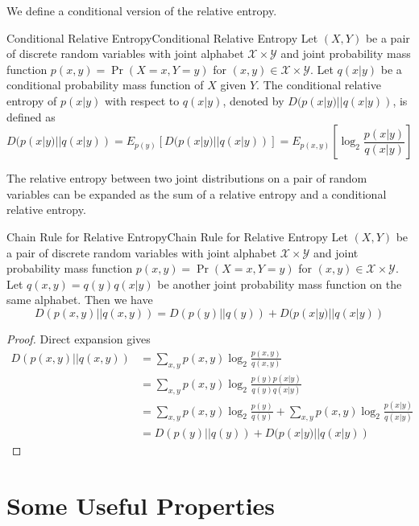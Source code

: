 \documentclass[../main.tex]{subfiles}
\begin{document}
We define a conditional version of the relative entropy.
\begin{definition}{Conditional Relative Entropy}{Conditional Relative Entropy}
  Let $(X,Y)$ be a pair of discrete random variables with joint alphabet $\mathcal{X} \times \mathcal{Y}$ and joint probability mass function $p(x,y) = \Pr(X=x,Y=y)$ for $(x,y) \in \mathcal{X} \times \mathcal{Y}$. Let $q(x|y)$ be a conditional probability mass function of $X$ given $Y$. The conditional relative entropy of $p(x|y)$ with respect to $q(x|y)$, denoted by $D(p(x|y)||q(x|y))$, is defined as
  \begin{equation}
    D(p(x|y)||q(x|y)) = E_{p(y)}[D(p(x|y)||q(x|y))] = E_{p(x,y)}\left[\log_2 \frac{p(x|y)}{q(x|y)}\right]
  \end{equation}
\end{definition}

The relative entropy between two joint distributions on a pair of random variables can be expanded as the sum of a relative entropy and a conditional relative entropy.

\begin{theorem}{Chain Rule for Relative Entropy}{Chain Rule for Relative Entropy}
  Let $(X,Y)$ be a pair of discrete random variables with joint alphabet $\mathcal{X} \times \mathcal{Y}$ and joint probability mass function $p(x,y) = \Pr(X=x,Y=y)$ for $(x,y) \in \mathcal{X} \times \mathcal{Y}$. Let $q(x,y) = q(y)q(x|y)$ be another joint probability mass function on the same alphabet. Then we have
  \begin{equation}
    D(p(x,y)||q(x,y)) = D(p(y)||q(y)) + D(p(x|y)||q(x|y))
  \end{equation}
\end{theorem}
\begin{proof}
  Direct expansion gives
  \begin{equation*}
    \begin{aligned}
      D(p(x,y)||q(x,y)) &= \sum_{x,y} p(x,y) \log_2 \frac{p(x,y)}{q(x,y)}\\
      &= \sum_{x,y} p(x,y) \log_2 \frac{p(y)p(x|y)}{q(y)q(x|y)}\\
      &= \sum_{x,y} p(x,y) \log_2 \frac{p(y)}{q(y)} + \sum_{x,y} p(x,y) \log_2 \frac{p(x|y)}{q(x|y)}\\
      &= D(p(y)||q(y)) + D(p(x|y)||q(x|y))
    \end{aligned}
  \end{equation*}
\end{proof}

\section{Some Useful Properties}
\end{document}
